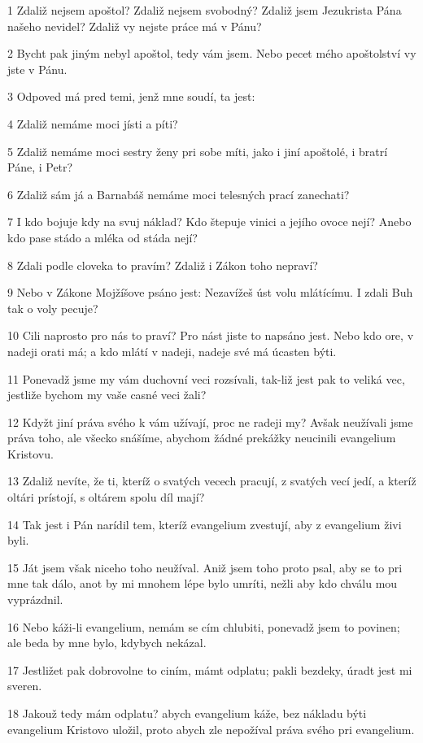 \par 1 Zdaliž nejsem apoštol? Zdaliž nejsem svobodný? Zdaliž jsem Jezukrista Pána našeho nevidel? Zdaliž vy nejste práce má v Pánu?
\par 2 Bycht pak jiným nebyl apoštol, tedy vám jsem. Nebo pecet mého apoštolství vy jste v Pánu.
\par 3 Odpoved má pred temi, jenž mne soudí, ta jest:
\par 4 Zdaliž nemáme moci jísti a píti?
\par 5 Zdaliž nemáme moci sestry ženy pri sobe míti, jako i jiní apoštolé, i bratrí Páne, i Petr?
\par 6 Zdaliž sám já a Barnabáš nemáme moci telesných prací zanechati?
\par 7 I kdo bojuje kdy na svuj náklad? Kdo štepuje vinici a jejího ovoce nejí? Anebo kdo pase stádo a mléka od stáda nejí?
\par 8 Zdali podle cloveka to pravím? Zdaliž i Zákon toho nepraví?
\par 9 Nebo v Zákone Mojžíšove psáno jest: Nezavížeš úst volu mlátícímu. I zdali Buh tak o voly pecuje?
\par 10 Cili naprosto pro nás to praví? Pro nást jiste to napsáno jest. Nebo kdo ore, v nadeji orati má; a kdo mlátí v nadeji, nadeje své má úcasten býti.
\par 11 Ponevadž jsme my vám duchovní veci rozsívali, tak-liž jest pak to veliká vec, jestliže bychom my vaše casné veci žali?
\par 12 Kdyžt jiní práva svého k vám užívají, proc ne radeji my? Avšak neužívali jsme práva toho, ale všecko snášíme, abychom žádné prekážky neucinili evangelium Kristovu.
\par 13 Zdaliž nevíte, že ti, kteríž o svatých vecech pracují, z svatých vecí jedí, a kteríž oltári prístojí, s oltárem spolu díl mají?
\par 14 Tak jest i Pán narídil tem, kteríž evangelium zvestují, aby z evangelium živi byli.
\par 15 Ját jsem však niceho toho neužíval. Aniž jsem toho proto psal, aby se to pri mne tak dálo, anot by mi mnohem lépe bylo umríti, nežli aby kdo chválu mou vyprázdnil.
\par 16 Nebo káži-li evangelium, nemám se cím chlubiti, ponevadž jsem to povinen; ale beda by mne bylo, kdybych nekázal.
\par 17 Jestližet pak dobrovolne to ciním, mámt odplatu; pakli bezdeky, úradt jest mi sveren.
\par 18 Jakouž tedy mám odplatu? abych evangelium káže, bez nákladu býti evangelium Kristovo uložil, proto abych zle nepožíval práva svého pri evangelium.
